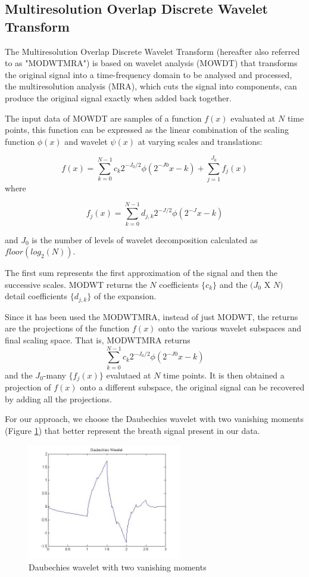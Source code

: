 \subsection{Multiresolution Overlap Discrete Wavelet Transform} \label{Wavelet}

The Multiresolution Overlap Discrete Wavelet Transform (hereafter also referred to as "MODWTMRA") is based on wavelet analysis (MOWDT) that transforms the original signal into a time-frequency domain to be analysed and processed, the multiresolution analysis (MRA), which cuts the signal into components, can produce the original signal exactly when added back together.

The input data of MOWDT are samples of a function $f(x)$ evaluated at $N$ time points, this function can be expressed as the linear combination of the scaling function $\phi(x)$ and wavelet $\psi(x)$ at varying scales and translations:

$$f(x)=\sum_{k=0}^{N-1} c_k 2^{-J_0/2} \phi(2^{-J0}x-k) + \sum_{j=1}^{J_0}f_j(x)$$
where 

$$f_j(x)=\sum_{k=0}^{N-1} d_{j,k}2^{-J/2} \phi(2^{-J}x-k)$$

and $J_0$ is the number of levels of wavelet decomposition calculated as $floor(log_2(N))$.

The first sum represents the first approximation of the signal and then the successive scales.
MODWT returns the $N$ coefficients $\{c_k\}$ and the $(J_0 $ X $ N)$ detail coefficients $\{d_{j,k}\}$ of the expansion. 

Since it has been used the MODWTMRA, instead of just MODWT, the returns are the projections of the function $f(x)$ onto the various wavelet subspaces and final scaling space. That is, MODWTMRA returns 
$$\sum_{k=0}^{N-1} c_k 2^{-J_0/2} \phi(2^{-J0}x-k)$$\newline
and the $J_0$-many $\{f_j(x)\}$ evalutaed at $N$ time points.
It is then obtained a projection of $f(x)$ onto a different subspace, the original signal can be recovered by adding all the projections. 

For our approach, we choose the Daubechies wavelet with two vanishing moments (Figure \ref{fig:Daubechies}) that better represent the breath signal present in our data.

\begin{figure}[h]
    \centering
    \includegraphics[width=0.6\textwidth]{img/gooddb.jpeg}
    \caption{Daubechies wavelet with two vanishing moments}
    \label{fig:Daubechies}
\end{figure}


